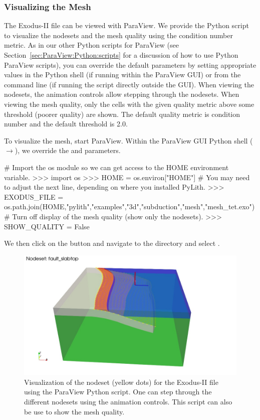 \subsubsection{Visualizing the Mesh}

The Exodus-II file  can be viewed with
ParaView. We provide the Python script  to
visualize the nodesets and the mesh quality using the condition number
metric. As in our other Python scripts for ParaView (see
Section~\vref{sec:ParaView:Python:scripts} for a discussion of how to use
Python ParaView scripts), you can override the default
parameters by setting appropriate values in the Python shell (if
running within the ParaView GUI) or from the command line (if running
the script directly outside the GUI). When viewing the nodesets, the
animation controls allow stepping through the nodesets. When viewing
the mesh quality, only the cells with the given quality metric above
some threshold (poorer quality) are shown. The default quality metric
is condition number and the default threshold is 2.0.

To visualize the mesh, start ParaView. Within the ParaView GUI Python shell
($\rightarrow$), we override the
 and  parameters.
\begin{python}
# Import the os module so we can get access to the HOME environment variable.
>>> import os
>>> HOME = os.environ["HOME"]
# You may need to adjust the next line, depending on where you installed PyLith.
>>> EXODUS_FILE = os.path.join(HOME,"pylith","examples","3d","subduction","mesh","mesh_tet.exo")
# Turn off display of the mesh quality (show only the nodesets).
>>> SHOW_QUALITY = False
\end{python}
We then click on the  button and navigate to the
 directory and select
.

\begin{figure}[htbp]
  \includegraphics[width=5.0in]{examples/figs/subduction3d_mesh}
  \caption{Visualization of the  nodeset
    (yellow dots) for the Exodus-II file 
    using the  ParaView Python script. One
    can step through the different nodesets using the animation
    controls. This script can also be use to show the mesh quality.}
  \label{fig:example:subduction:3d:mesh}
\end{figure}

